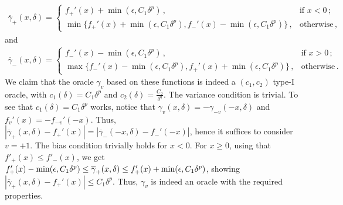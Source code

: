 \begin{align}
\overline{\gamma}_+(x,\delta) = 
	\begin{cases}
	f_+'(x) + \min(\epsilon,C_1\delta^p)\,, & \text{if } x<0\,; \\
	\min\big\{f_+'(x) + \min(\epsilon,C_1\delta^p), f_-'(x) - \min(\epsilon,C_1\delta^p)\big\}\,, & \text{otherwise}\,,
	\end{cases}
	\label{eq:og1}
\end{align}
and
\begin{align}
\overline{\gamma}_-(x,\delta) = 
	\begin{cases}
	f_-'(x) - \min(\epsilon,C_1\delta^p)\,, & \text{if } x>0\,; \\
	\max\big\{f_-'(x) - \min(\epsilon,C_1\delta^p), f_+'(x) + \min(\epsilon,C_1\delta^p)\big\}\,, & \text{otherwise}\,.
	\end{cases}
	\label{eq:og2}
\end{align}
We claim that the oracle $\gamma_v$ based on these functions
 is indeed a $(c_1,c_2)$ type-I oracle, with $c_1(\delta)=C_1\delta^p$ and $c_2(\delta)=\frac{C_2}{\delta^q}$. The variance condition is trivial.
To see that $c_1(\delta) = C_1\delta^p$ works, 
notice that $\gamma_v(x,\delta) = -\gamma_{-v}(-x,\delta)$ and $f_v'(x) = -f_{-v}'(-x)$. Thus,
$|\overline{\gamma}_+(x,\delta)-f_+'(x)| = |\overline{\gamma}_-(-x,\delta)-f_-'(-x)|$, hence it suffices to consider $v=+1$.
The bias condition trivially holds for $x<0$. For $x\ge 0$, using that $f'_+(x) \le f'_-(x)$, we get
$f'_+(x) - \min(\epsilon,C_1\delta^p) \le \overline{\gamma}_+(x,\delta) \le f'_+(x) + \min(\epsilon,C_1\delta^p)$, showing 
$|\overline{\gamma}_+(x,\delta)-f_+'(x)|  \le C_1 \delta^p$.
Thus, $\gamma_v$ is indeed an oracle with the required properties.


